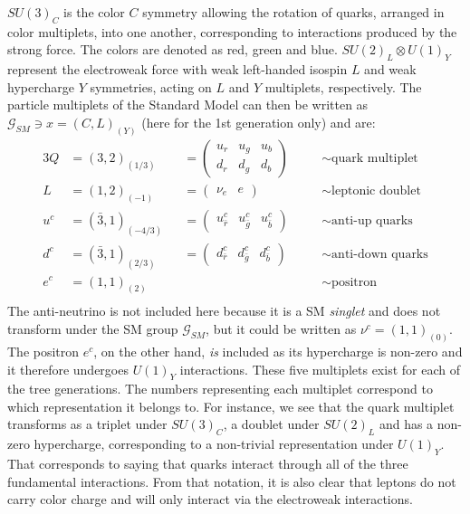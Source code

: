 $SU(3)_C$ is the color $C$ symmetry allowing the rotation of quarks, arranged in color multiplets, into one another, corresponding to interactions produced by the strong force. The colors are denoted as red, green and blue. $SU (2)_L \otimes U(1)_Y$ represent the electroweak force with weak left-handed isospin $L$ and weak hypercharge $Y$ symmetries, acting on $L$ and $Y$ multiplets, respectively. %
The particle multiplets of the Standard Model can then be written as $\mathcal{G}_{SM} \ni x=(C,L)_{(Y)}$ (here for the 1st generation only) and are:
\begin{alignat*}{3}
Q &= (3,2)_{(1/3)} &&=
  \begin{pmatrix} 
    u_r & u_g & u_b \\
    d_r & d_g & d_b
    \end{pmatrix} \quad  &&\sim \textrm{quark multiplet} \\[1pt]
L &= (1,2)_{(-1)} &&= \begin{pmatrix} \nu_e & e \end{pmatrix} \quad &&\sim \textrm{leptonic doublet} \\[1pt]
u^c &= (\bar{3},1)_{(-4/3)} &&= \begin{pmatrix} u_{\bar{r}}^c & u_{\bar{g}}^c & u_{\bar{b}}^c\end{pmatrix} \quad &&\sim \textrm{anti-up quarks} \\[1pt]
d^c &= (\bar{3},1)_{(2/3)}  &&= \begin{pmatrix} d_{\bar{r}}^c & d_{\bar{g}}^c & d_{\bar{b}}^c\end{pmatrix} \quad &&\sim \textrm{anti-down quarks} \\[1pt]
e^c &= (1,1)_{(2)}          && \quad &&\sim \textrm{positron} \\
\end{alignat*}
The anti-neutrino is not included here because it is a SM \emph{singlet} and does not transform under the SM group $\mathcal{G}_{SM}$, but it could be written as $\nu^c=(1,1)_(0)$. The positron $e^c$, on the other hand, \emph{is} included as its hypercharge is non-zero and it therefore undergoes $U(1)_Y$ interactions. These five multiplets exist for each of the tree generations.\newline
The numbers representing each multiplet correspond to which representation it belongs to. For instance, we see that the quark multiplet transforms as a triplet under $SU(3)_C$, a doublet under $SU(2)_L$ and has a non-zero hypercharge, corresponding to a non-trivial representation under $U(1)_Y$. That corresponds to saying that quarks interact through all of the three fundamental interactions. From that notation, it is also clear that leptons do not carry color charge and will only interact via the electroweak interactions.\newline
